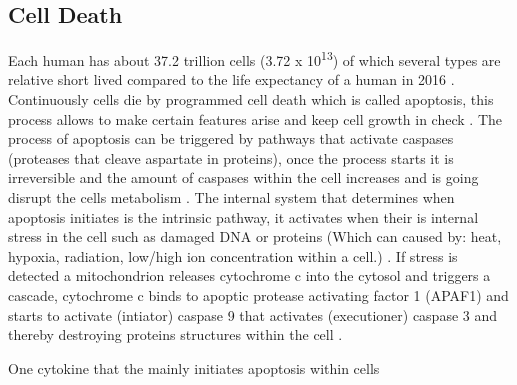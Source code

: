 \subsection{Cell Death}
Each human has about 37.2 trillion cells (3.72 x 10\textsuperscript{13}) \cite{} of which several types are relative short lived \cite{} compared to the life expectancy of a human in 2016 \cite{}. 
Continuously cells die by programmed cell death which is called apoptosis, this process allows to make certain features arise and keep cell growth in check \cite{}.
The process of apoptosis can be triggered by pathways that activate caspases (proteases that cleave aspartate in proteins), once the process starts it is irreversible and the amount of caspases within the cell increases and is going disrupt the cells metabolism \cite{}.
The internal system that determines when apoptosis initiates is the intrinsic pathway, it activates when their is internal stress in the cell such as damaged DNA or proteins (Which can caused by: heat, hypoxia, radiation, low/high ion concentration within a cell.)  \cite{}. 
If stress is detected a mitochondrion releases cytochrome c into the cytosol and triggers a cascade, cytochrome c binds to apoptic protease activating factor 1 (APAF1) and starts to activate (intiator) caspase 9 that activates (executioner) caspase 3 and thereby destroying proteins structures within the cell \cite{}. 

One cytokine that the mainly initiates apoptosis within cells 

